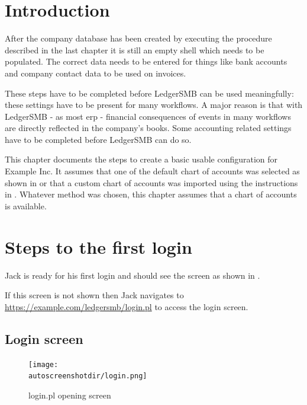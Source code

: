 \section{Introduction}
\label{sec-first-login-introduction}

After the company database has been created by executing the procedure described in the last
chapter it is still an empty shell which needs to be populated. The correct data
needs to be entered for things like bank accounts and company contact data to be used
on invoices.

These steps have to be completed before LedgerSMB can be used meaningfully: these
settings have to be present for many workflows. A major reason is that with LedgerSMB
- as most \gls{erp} - financial
consequences of events in many workflows are directly reflected in the company's books.
Some accounting related settings have to be completed before LedgerSMB can do so.

This chapter documents the steps to create a basic usable configuration for Example Inc. 
It assumes that
one of the default chart of accounts was selected as shown in  or 
that a custom chart of accounts was imported using the instructions in . 
Whatever method was chosen, this chapter assumes that a chart of accounts is available.

\section{Steps to the first login}
\label{sec-first-login-ramp-up}

Jack is ready for his first login and should see the screen as shown in .

If this screen is not shown then Jack navigates to 
\url{https://example.com/ledgersmb/login.pl} to access the login screen.

\subsection{Login screen}
\label{subsec-first-login-screen}

\begin{figure}[H]
\centering
\texttt{[image: \\autoscreenshotdir/login.png]}
\caption{login.pl opening screen}
\label{fig:login-screen}
\end{figure}


